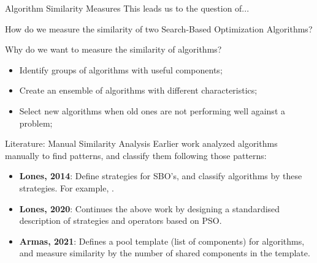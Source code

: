 \documentclass[aspectratio=169]{beamer}
\begin{document}
\begin{frame}{Algorithm Similarity Measures}
  This leads us to the question of...
  \begin{block}{}
    \begin{center}
      How do we measure the similarity of two Search-Based Optimization Algorithms?
    \end{center}
  \end{block}\bigskip

  Why do we want to measure the similarity of algorithms?
  \begin{itemize}
  \item Identify groups of algorithms with useful components;
  \item Create an ensemble of algorithms with different characteristics;
  \item Select new algorithms when old ones are not performing well
    against a problem;
  \end{itemize}
\end{frame}

\begin{frame}{Literature: Manual Similarity Analysis}
  Earlier work analyzed algorithms manually to find patterns, and
  classify them following those patterns:\bigskip

  \begin{itemize}
  \item {\bf Lones, 2014}: Define strategies for SBO's, and classify
    algorithms by these strategies. For example,
    .
  \item {\bf Lones, 2020}: Continues the above work by designing a
    standardised description of strategies and operators based on PSO.
  \item {\bf Armas, 2021}: Defines a pool template (list of
    components) for algorithms, and measure similarity by the number
    of shared components in the template.
  \end{itemize}
\end{frame}
\end{document}
